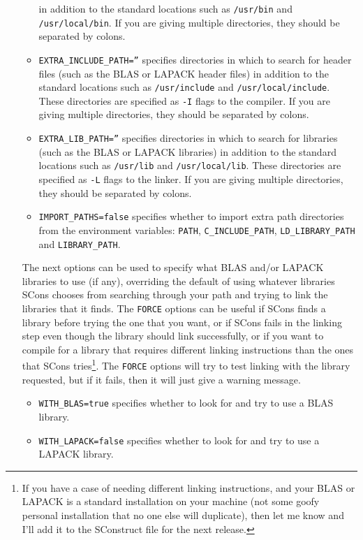 \begin{enumerate}
\begin{itemize}
in addition to the standard locations such as \texttt{/usr/bin} and \texttt{/usr/local/bin}.
If you are giving multiple directories, they should be separated by colons.
\item \texttt{EXTRA\_INCLUDE\_PATH=''} specifies directories in which to search for header files
(such as the BLAS or LAPACK header files)
in addition to the standard locations such as \texttt{/usr/include} and \texttt{/usr/local/include}.
These directories are specified as \texttt{-I} flags to the compiler.
If you are giving multiple directories, they should be separated by colons.
\item \texttt{EXTRA\_LIB\_PATH=''} specifies directories in which to search for libraries
(such as the BLAS or LAPACK libraries)
in addition to the standard locations such as \texttt{/usr/lib} and \texttt{/usr/local/lib}.  
These directories are specified as \texttt{-L} flags to the linker.
If you are giving multiple directories, they should be separated by colons.
\item \texttt{IMPORT\_PATHS=false} specifies whether to import extra path directories from the environment variables: 
\texttt{PATH}, \texttt{C\_INCLUDE\_PATH}, \texttt{LD\_LIBRARY\_PATH} and \texttt{LIBRARY\_PATH}.
\end{itemize}
The next options can be used to specify what BLAS and/or LAPACK libraries to use (if any),
overriding the default of using whatever libraries SCons chooses from searching through your path
and trying to link the libraries that it finds.  The \texttt{FORCE} options can be useful if SCons finds
a library before trying the one that you want, or if SCons fails in the linking step even though
the library should link successfully, or if
you want to compile for a library that requires different linking instructions than the 
ones that SCons tries\footnote{
If you have a case of needing different linking instructions, and your BLAS or LAPACK is a standard
installation on your machine (not some goofy personal installation that no one else will duplicate),
then let me know and I'll add it to the SConstruct file for the next release.}.
The \texttt{FORCE} options will try to test linking with the library requested,
but if it fails, then it will just give a warning message.
\begin{itemize}
\item \texttt{WITH\_BLAS=true} specifies whether to look for and try to use a BLAS library.
\item \texttt{WITH\_LAPACK=false} specifies whether to look for and try to use a LAPACK library.

\end{itemize}
\end{enumerate}
